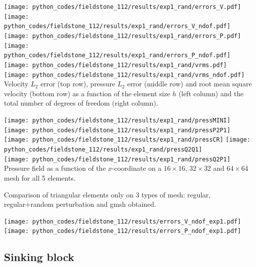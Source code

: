 \begin{center}
\texttt{[image: python\_codes/fieldstone\_112/results/exp1\_rand/errors\_V.pdf]}
\texttt{[image: python\_codes/fieldstone\_112/results/exp1\_rand/errors\_V\_ndof.pdf]}\\
\texttt{[image: python\_codes/fieldstone\_112/results/exp1\_rand/errors\_P.pdf]}
\texttt{[image: python\_codes/fieldstone\_112/results/exp1\_rand/errors\_P\_ndof.pdf]}\\
\texttt{[image: python\_codes/fieldstone\_112/results/exp1\_rand/vrms.pdf]}
\texttt{[image: python\_codes/fieldstone\_112/results/exp1\_rand/vrms\_ndof.pdf]}\\
{\captionfont Velocity $L_2$ error (top row), pressure $L_2$ error (middle row) and root
mean square velocity (bottom row) as a function of the element size $h$ (left column) 
and the total number of degrees of freedom (right column).}
\end{center}

\newpage
\begin{center}
\texttt{[image: python\_codes/fieldstone\_112/results/exp1\_rand/pressMINI]}
\texttt{[image: python\_codes/fieldstone\_112/results/exp1\_rand/pressP2P1]}\\
\texttt{[image: python\_codes/fieldstone\_112/results/exp1\_rand/pressCR]}
\texttt{[image: python\_codes/fieldstone\_112/results/exp1\_rand/pressQ2Q1]}\\
\texttt{[image: python\_codes/fieldstone\_112/results/exp1\_rand/pressQ2P1]}\\
{\captionfont Pressure field as a function of the $x$-coordinate on a $16\times16$,
$32\times 32$ and $64\times 64$ mesh for all 5 elements.} 
\end{center}

\newpage
Comparison of triangular elements only on 3 types of mesh: regular, regular+random perturbation 
and gmsh obtained.

\begin{center}
\texttt{[image: python\_codes/fieldstone\_112/results/errors\_V\_ndof\_exp1.pdf]}\\
\texttt{[image: python\_codes/fieldstone\_112/results/errors\_P\_ndof\_exp1.pdf]}
\end{center}




\newpage
\subsection*{Sinking block}

